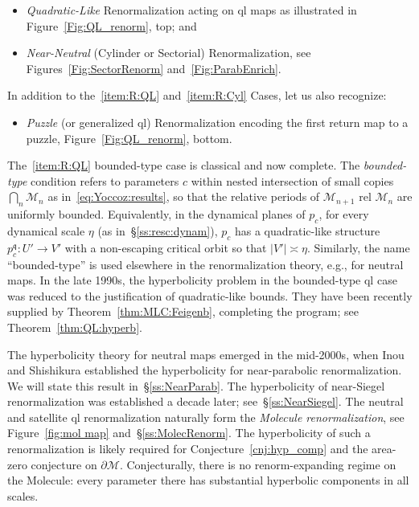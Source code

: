 \documentclass[twoside,leqno]{article}
\makeatletter
\theoremstyle{plain}
\newcommand\MM{{\mathcal{M}}}
\newcommand{\setword}[2]{%
  \phantomsection
  #1\def\@currentlabel{\unexpanded{#1}}\label{#2}%
}
\newcommand{\qq}{\mathfrak{q}}
\makeatother
\begin{document}

\begin{itemize}
  \item[\setword{(QL)}{item:R:QL}] \emph{Quadratic-Like} Renormalization acting on ql maps as illustrated in Figure~\ref{Fig:QL_renorm}, top; and
  \item[\setword{(Neut)}{item:R:Cyl}] \emph{Near-Neutral} (Cylinder or Sectorial) Renormalization, see Figures~\ref{Fig:SectorRenorm} and~\ref{Fig:ParabEnrich}.
\end{itemize}

In addition to the~\ref{item:R:QL} and~\ref{item:R:Cyl} Cases, let us also recognize:
\begin{itemize}
      \item[\setword{(Puz)}{item:R:puz}] \emph{Puzzle} (or generalized ql) Renormalization encoding the first return map to a puzzle, Figure~\ref{Fig:QL_renorm}, bottom.
\end{itemize}



The~\ref{item:R:QL} bounded-type case is classical and now complete. The \emph{bounded-type} condition refers to parameters $c$ within nested intersection of small copies $\bigcap_n \MM_n$ as in~\eqref{eq:Yoccoz:results}, so that the relative periods of $\MM_{n+1}$ rel $\MM_n$ are uniformly bounded. Equivalently, in the dynamical planes of $p_c$, for every dynamical scale $\eta$ (as in~\S\ref{ss:resc:dynam}), $p_c$ has a quadratic-like structure $p^{\qq}_c\colon U'\to V'$ with a non-escaping critical orbit so that $|V'|\asymp \eta$. Similarly, the name ``bounded-type'' is used elsewhere in the renormalization theory, e.g., for neutral maps. In the late 1990s, the hyperbolicity problem in the bounded-type ql case was reduced to the justification of quadratic-like bounds. They have been recently supplied by Theorem~\ref{thm:MLC:Feigenb}, completing the program; see Theorem~\ref{thm:QL:hyperb}.

The hyperbolicity theory for neutral maps emerged in the mid-2000s, when Inou and Shishikura established the hyperbolicity for near-parabolic renormalization. We will state this result in~\S\ref{ss:NearParab}. The hyperbolicity of near-Siegel renormalization was established a decade later; see~\S\ref{ss:NearSiegel}. The neutral and satellite ql renormalization naturally form the \emph{Molecule renormalization}, see Figure~\ref{fig:mol map} and~\S\ref{ss:MolecRenorm}. The hyperbolicity of such a renormalization is likely required for Conjecture~\ref{cnj:hyp_comp} and the area-zero conjecture on $\partial \MM$. Conjecturally, there is no renorm-expanding regime on the Molecule: every parameter there has substantial hyperbolic components in all scales.
\end{document}
